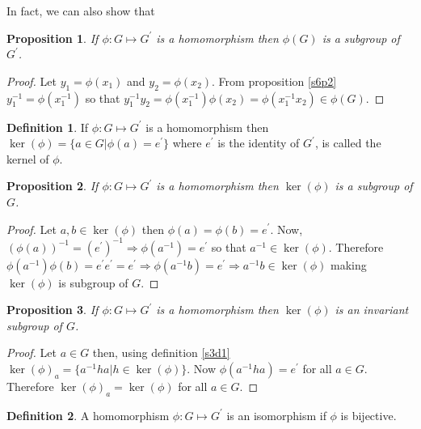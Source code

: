 \documentclass{article}
\theoremstyle{plain}
\numberwithin{thm}{section}
\theoremstyle{plain}
\newtheorem{prop}{Proposition}
\numberwithin{prop}{section}
\theoremstyle{definition}
\newtheorem{defn}{Definition}
\numberwithin{defn}{section}
\theoremstyle{remark}
\numberwithin{equation}{section}
\begin{document}
In fact, we can also show that
\begin{prop}\label{s6p4}
If $\phi: G \mapsto G^\prime$ is a homomorphism then $\phi(G)$ is a subgroup
of $G^\prime$.
\end{prop}
\begin{proof}
Let $y_1 = \phi(x_1)$ and $y_2 = \phi(x_2)$. From proposition \ref{s6p2}
$y_1^{-1} = \phi(x_1^{-1})$ so that $y^{-1}_1y_2 = \phi(x_1^{-1})\phi(x_2)
= \phi(x_1^{-1}x_2) \in \phi(G)$.
\end{proof}

\begin{defn}\label{s6d2}
If $\phi: G \mapsto G^\prime$ is a homomorphism then $\ker(\phi) = \{a \in G
| \phi(a) = e^\prime\}$ where $e^\prime$ is the identity of $G^\prime$, is
called the kernel of $\phi$.
\end{defn}

\begin{prop}\label{s6p5}
If $\phi: G \mapsto G^\prime$ is a homomorphism then $\ker(\phi)$ is a subgroup 
of $G$.
\end{prop}
\begin{proof}
Let $a, b \in \ker(\phi)$ then $\phi(a) = \phi(b) = e^\prime$. Now, 
$(\phi(a))^{-1} = (e^\prime)^{-1} \Rightarrow \phi(a^{-1}) = e^\prime$
so that $a^{-1} \in \ker(\phi)$. Therefore $\phi(a^{-1})\phi(b) = e^\prime
e^\prime = e^\prime \Rightarrow \phi(a^{-1}b) = e^\prime \Rightarrow a^{-1}b
\in \ker(\phi)$ making $\ker(\phi)$ is subgroup of $G$.
\end{proof}

\begin{prop}\label{s6p6}
If $\phi: G \mapsto G^\prime$ is a homomorphism then $\ker(\phi)$ is an
invariant subgroup of $G$.
\end{prop}
\begin{proof}
Let $a \in G$ then, using definition \ref{s3d1} $\ker(\phi)_a = \{a^{-1}ha|
h \in \ker(\phi)\}$. Now $\phi(a^{-1}ha) = e^\prime$ for all $a \in G$. 
Therefore $\ker(\phi)_a = \ker(\phi)$ for all $a \in G$.
\end{proof}

\begin{defn}\label{s6d3}
A homomorphism $\phi: G \mapsto G^\prime$ is an isomorphism if $\phi$ is 
bijective.
\end{defn}
\end{document}

